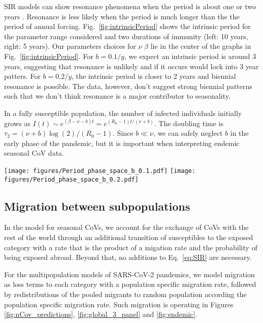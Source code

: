 \documentclass[rmp, reprint, superscriptaddress, floatfix,amsmath]{revtex4-1}
\begin{document}
SIR models can show resonance phenomena when the period is about one or two years \citep{dushoff_dynamical_2004,chen_regular_2017}.
Resonance is less likely when the period is much longer than the the period of annual forcing.
Fig.~\ref{fig:intrinsicPeriod} shows the intrinsic period for the parameter range considered and two durations of immunity (left: 10 years, right: 5 years). 
Our parameters choices for $\nu$ $\beta$ lie in the center of the graphs in Fig.~\ref{fig:intrinsicPeriod}. 
For $b=0.1/y$, we expect an intrinsic period is around 3 years, suggesting that resonance is unlikely and if it occurs would lock into 3 year patters.
For $b=0.2/y$, the intrinsic period is closer to 2 years and biennial resonance is possible. 
The data, however, don't suggest strong biennial patterns such that we don't think resonance is a major contributor to seasonality.

In a fully susceptible population, the number of infected individuals initially grows as $I(t)\sim e^{(\beta-\nu-b)t} = e^{(R_0-1)t/(\nu+b)}$.
The doubling time is $\tau_2 = (\nu+b)\log(2)/(R_0-1)$.
Since $b\ll \nu$, we can safely neglect $b$ in the early phase of the pandemic, but it is important when interpreting endemic seasonal CoV data. 


\begin{figure*}[htb]
	\centering
	\texttt{[image: figures/Period\_phase\_space\_b\_0.1.pdf]}
	\texttt{[image: figures/Period\_phase\_space\_b\_0.2.pdf]}
\caption{Length of the intrinsic period of the SIR model for $\beta$ and $\nu$ values in the range explored in this paper. The duration of immunity is assumed to be $10$ years in the panel on the left and 5 years in the panel on the right. The dark blue region corresponds to $R_0<1$. }
	\label{fig:intrinsicPeriod}
\end{figure*}


\subsection*{Migration between subpopulations}

In the model for seasonal CoVs, we account for the exchange of CoVs with the rest of the world through an additional transition of susceptibles to the exposed category with a rate that is the product of a migation rate and the probability of being exposed abroad. 
Beyond that, no additions to Eq.~\ref{eq:SIR} are necessary.

For the multipopulation models of SARS-CoV-2 pandemics, we model migration as loss terms to each category with a population specific migration rate, followed by redistributions of the pooled migrants to random population according the population specific migration rate. 
Such migration is operating in Figures \ref{fig:nCov_predictions}, \ref{fig:global_3_panel} and \ref{fig:endemic}. 
\end{document}
